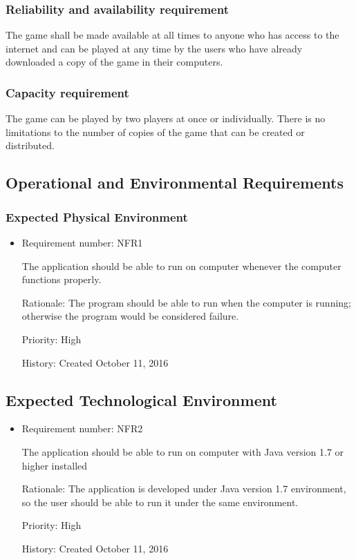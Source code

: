 \documentclass[12pt,letterpaper]{article}
\begin{document}
\subsubsection{Reliability and availability requirement}
   	The game shall be made available at all times to anyone who has access to the internet and can be played at any time by the users who have already downloaded a copy of the game in their computers.
\subsubsection{Capacity requirement}
   	The game can be played by two players at once or individually. There is no limitations to the number of copies of the game that can be created or distributed.
\subsection{Operational and Environmental Requirements}
\subsubsection{Expected Physical Environment}
\begin{itemize}
	\item Requirement number: NFR1

	The application should be able to run on computer whenever the computer functions properly.

	Rationale: The program should be able to run when the computer is running; otherwise the program would be considered failure.

	Priority: High
	
	History: Created October 11, 2016
\end{itemize}
\subsection{Expected Technological Environment}
\begin{itemize}
	\item Requirement number: NFR2

	The application should be able to run on computer with Java version 1.7 or higher installed

	Rationale: The application is developed under Java version 1.7 environment, so the user should be able to run it under the same environment. 

	Priority: High

	History: Created October 11, 2016
\end{itemize}
\end{document}
